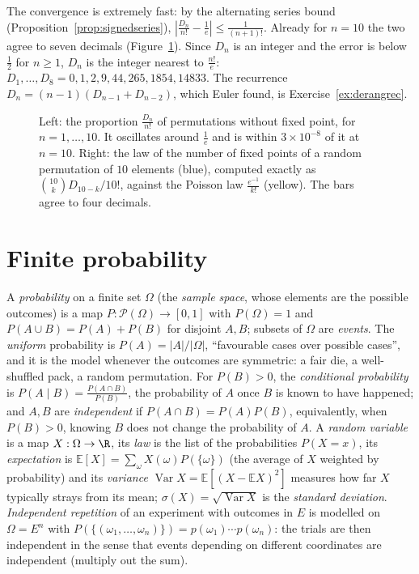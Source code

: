 The convergence is extremely fast: by the alternating series bound (Proposition~\ref{prop:signedseries}), $\left|\frac{D_n}{n!}-\frac1e\right|\le\frac1{(n+1)!}$. Already for $n=10$ the two agree to seven decimals (Figure~\ref{fig:derang}). Since $D_n$ is an integer and the error is below $\frac12$ for $n\ge1$, $D_n$ is the integer nearest to $\frac{n!}e$: $D_1,\dots,D_8=0,1,2,9,44,265,1854,14833$. The recurrence $D_n=(n-1)(D_{n-1}+D_{n-2})$, which Euler found, is Exercise~\ref{ex:derangrec}.

\begin{figure}[ht]
\centering
{}
\caption{Left: the proportion $\frac{D_n}{n!}$ of permutations without fixed point, for $n=1,\dots,10$. It oscillates around $\frac1e$ and is within $3\times10^{-8}$ of it at $n=10$. Right: the law of the number of fixed points of a random permutation of $10$ elements (blue), computed exactly as $\binom{10}kD_{10-k}/10!$, against the Poisson law $\frac{e^{-1}}{k!}$ (yellow). The bars agree to four decimals.}
\label{fig:derang}
\end{figure}

\section{Finite probability}

\begin{reminder}
A \emph{probability} on a finite set $\Omega$ (the \emph{sample space}, whose elements are the possible outcomes) is a map $P:\mathcal P(\Omega)\to[0,1]$ with $P(\Omega)=1$ and $P(A\cup B)=P(A)+P(B)$ for disjoint $A,B$; subsets of $\Omega$ are \emph{events}. The \emph{uniform} probability is $P(A)=|A|/|\Omega|$, ``favourable cases over possible cases'', and it is the model whenever the outcomes are symmetric: a fair die, a well-shuffled pack, a random permutation. For $P(B)>0$, the \emph{conditional probability} is $P(A\mid B)=\frac{P(A\cap B)}{P(B)}$, the probability of $A$ once $B$ is known to have happened; and $A,B$ are \emph{independent} if $P(A\cap B)=P(A)P(B)$, equivalently, when $P(B)>0$, knowing $B$ does not change the probability of $A$. A \emph{random variable} is a map $X:\Omega\to\R$, its \emph{law} is the list of the probabilities $P(X=x)$, its \emph{expectation} is $\mathbb E[X]=\sum_\omega X(\omega)P(\{\omega\})$ (the average of $X$ weighted by probability) and its \emph{variance} $\operatorname{Var}X=\mathbb E\left[(X-\mathbb E X)^2\right]$ measures how far $X$ typically strays from its mean; $\sigma(X)=\sqrt{\operatorname{Var}X}$ is the \emph{standard deviation}. \emph{Independent repetition} of an experiment with outcomes in $E$ is modelled on $\Omega=E^n$ with $P(\{(\omega_1,\dots,\omega_n)\})=p(\omega_1)\cdots p(\omega_n)$: the trials are then independent in the sense that events depending on different coordinates are independent (multiply out the sum).
\end{reminder}

